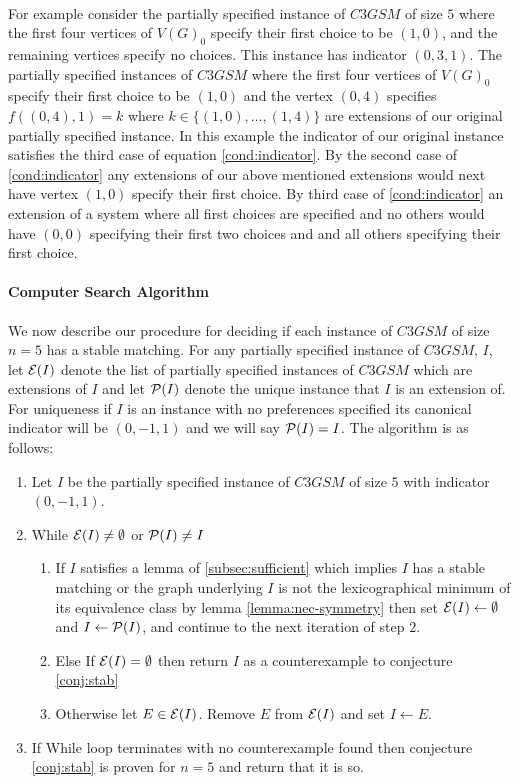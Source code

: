 \begin{definition}
\paragraph{}
For example consider the partially specified instance of $C3GSM$ of size $5$ where the first four vertices of $V(G)_0$ specify their first choice to be $(1,0)$, and the remaining vertices specify no choices. This instance has indicator $(0,3,1)$. The partially specified instances of $C3GSM$ where the first four vertices of $V(G)_0$ specify their first choice to be $(1,0)$ and the vertex $(0,4)$ specifies $f((0,4),1) = k$ where $k \in \{(1,0), \dots, (1,4)\}$ are extensions of our original partially specified instance. In this example the indicator of our original instance satisfies the third case of equation \ref{cond:indicator}. By the second case of \ref{cond:indicator} any extensions of our above mentioned extensions would next have vertex $(1,0)$ specify their first choice. By third case of \ref{cond:indicator} an extension of a system where all first choices are specified and no others would have $(0,0)$ specifying their first two choices and and all others specifying their first choice.
\paragraph{Computer Search Algorithm}
We now describe our procedure for deciding if each instance of $C3GSM$ of size $n=5$ has a stable matching. For any partially specified instance of $C3GSM$, $I$, let $\mathcal{E}(I)$ denote the list of partially specified instances of $C3GSM$ which are extensions of $I$ and let $\mathcal{P}(I)$ denote the unique instance that $I$ is an extension of. For uniqueness if $I$ is an instance with no preferences specified its canonical indicator will be $(0,-1,1)$ and we will say $\mathcal{P}(I) = I$. The algorithm is as follows:
\begin{enumerate}
\item Let $I$ be the partially specified instance of $C3GSM$ of size $5$ with indicator $(0,-1,1)$.
\item While $\mathcal{E}(I) \neq \emptyset$ or $\mathcal{P}(I) \neq I$
	\begin{enumerate}
	\item If $I$ satisfies a lemma of \ref{subsec:sufficient} which implies $I$ has a stable matching or the graph underlying $I$ is not the lexicographical minimum of its equivalence class by lemma \ref{lemma:nec-symmetry} then set $\mathcal{E}(I) \leftarrow \emptyset$ and $I \leftarrow \mathcal{P}(I)$, and continue to the next iteration of step $2$.
	\item Else If $\mathcal{E}(I) = \emptyset$ then return $I$ as a counterexample to conjecture \ref{conj:stab}
	\item Otherwise let $E \in \mathcal{E}(I)$. Remove $E$ from $\mathcal{E}(I)$ and set $I \leftarrow E$. 
	\end{enumerate}
\item If While loop terminates with no counterexample found then conjecture \ref{conj:stab} is proven for $n=5$ and return that it is so.
\end{enumerate}

\end{definition}
